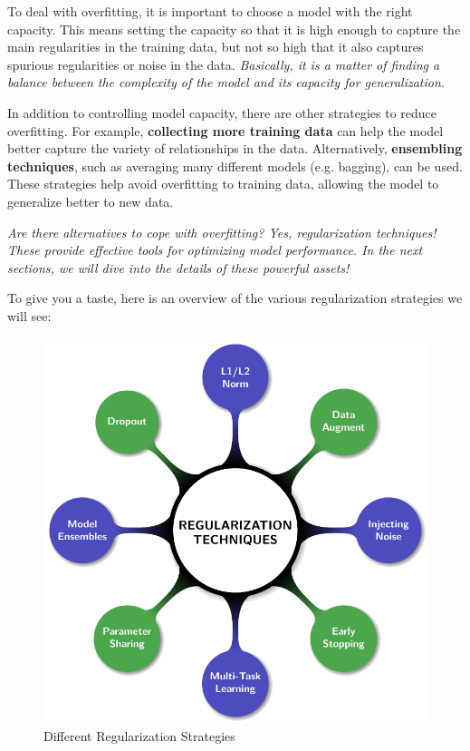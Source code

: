To deal with overfitting, it is important to choose a model with the right capacity. This means setting the capacity so that it is high enough to capture the main regularities in the training data, but not so high that it also captures spurious regularities or noise in the data. \textit{Basically, it is a matter of finding a balance between the complexity of the model and its capacity for generalization.}

In addition to controlling model capacity, there are other strategies to reduce overfitting. For example, \textbf{collecting more training data} can help the model better capture the variety of relationships in the data. Alternatively, \textbf{ensembling techniques}, such as averaging many different models (e.g. bagging), can be used. These strategies help avoid overfitting to training data, allowing the model to generalize better to new data.

\textit{Are there alternatives to cope with overfitting? Yes, regularization techniques! These provide effective tools for optimizing model performance. In the next sections, we will dive into the details of these powerful assets!}

To give you a taste, here is an overview of the various regularization strategies we will see:

\begin{figure}[!htbp]
    \centering
    \includegraphics[width = 0.8\linewidth]{tikz/chapter4 - Regularization Schema.pdf}
    \caption{Different Regularization Strategies}
\end{figure}

